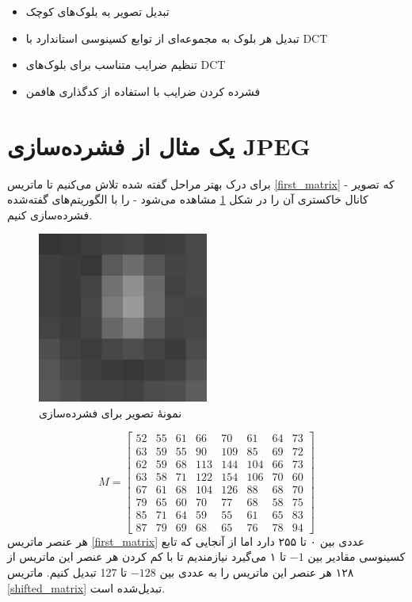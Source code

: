 \begin{itemize}
        \item تبدیل تصویر به بلوک‌های کوچک 
        \item تبدیل هر بلوک به مجموعه‌ای از توابع کسینوسی استاندارد با DCT
        \item تنظیم ضرایب متناسب برای بلوک‌های DCT 
        \item فشرده کردن ضرایب با استفاده از کدگذاری هافمن
\end{itemize}

\section{یک مثال از فشرده‌سازی JPEG}
برای درک بهتر مراحل گفته شده تلاش می‌کنیم تا ماتریس \ref{first_matrix} - که تصویر کانال خاکستری آن را در شکل 
\ref{jpeg_example}
مشاهده می‌شود -
را با الگوریتم‌های گفته‌شده فشرده‌سازی کنیم.
\begin{figure}[]
        \centering
        \includegraphics[width=0.5\textwidth]{figs/jpeg_block.png}
        \caption[نمونهٔ تصویر برای فشرده‌سازی]{نمونهٔ تصویر برای فشرده‌سازی \cite{jpeg_example}}
        \label{jpeg_example}
\end{figure}
\begin{equation}      
        M = \begin{bmatrix}
                52 & 55 & 61 & 66 & 70 & 61 & 64 & 73\\
                63 & 59 & 55 & 90 & 109 & 85 & 69 & 72 \\
                62 & 59 & 68 & 113 & 144 & 104 & 66 & 73 \\
                63 & 58 & 71 & 122 & 154 & 106 & 70 & 60 \\
                67 & 61 & 68 & 104 & 126 & 88 & 68 & 70 \\
                79 & 65 & 60 & 70 & 77 & 68 & 58 & 75 \\
                85 & 71 & 64 & 59 & 55 & 61 & 65 & 83 \\
                87 & 79 & 69 & 68 & 65 & 76 & 78 & 94 

        \end{bmatrix}
        \label{first_matrix}
\end{equation}
هر عنصر ماتریس \ref{first_matrix} عددی بین ۰ تا ۲۵۵ دارد اما از آنجایی که تابع کسینوسی 
مقادیر بین $-1$ تا ۱ می‌گیرد نیازمندیم تا با کم کردن هر عنصر این ماتریس از 
۱۲۸ 
هر عنصر این ماتریس را به عددی بین $-128$ تا 127 تبدیل کنیم.
ماتریس   \ref{shifted_matrix} تبدیل‌شده است.

